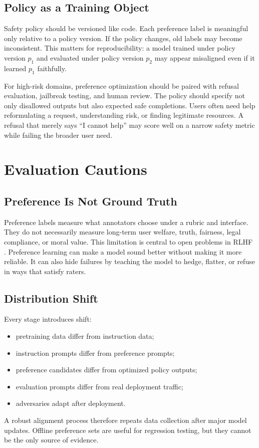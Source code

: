 \subsection{Policy as a Training Object}
Safety policy should be versioned like code. Each preference label is meaningful only relative to a policy version. If the policy changes, old labels may become inconsistent. This matters for reproducibility: a model trained under policy version $p_1$ and evaluated under policy version $p_2$ may appear misaligned even if it learned $p_1$ faithfully.

For high-risk domains, preference optimization should be paired with refusal evaluation, jailbreak testing, and human review. The policy should specify not only disallowed outputs but also expected safe completions. Users often need help reformulating a request, understanding risk, or finding legitimate resources. A refusal that merely says ``I cannot help'' may score well on a narrow safety metric while failing the broader user need.

\section{Evaluation Cautions}
\subsection{Preference Is Not Ground Truth}
Preference labels measure what annotators choose under a rubric and interface. They do not necessarily measure long-term user welfare, truth, fairness, legal compliance, or moral value. This limitation is central to open problems in RLHF \cite{casper2023open}. Preference learning can make a model sound better without making it more reliable. It can also hide failures by teaching the model to hedge, flatter, or refuse in ways that satisfy raters.

\subsection{Distribution Shift}
Every stage introduces shift:
\begin{itemize}
    \item pretraining data differ from instruction data;
    \item instruction prompts differ from preference prompts;
    \item preference candidates differ from optimized policy outputs;
    \item evaluation prompts differ from real deployment traffic;
    \item adversaries adapt after deployment.
\end{itemize}
A robust alignment process therefore repeats data collection after major model updates. Offline preference sets are useful for regression testing, but they cannot be the only source of evidence.

